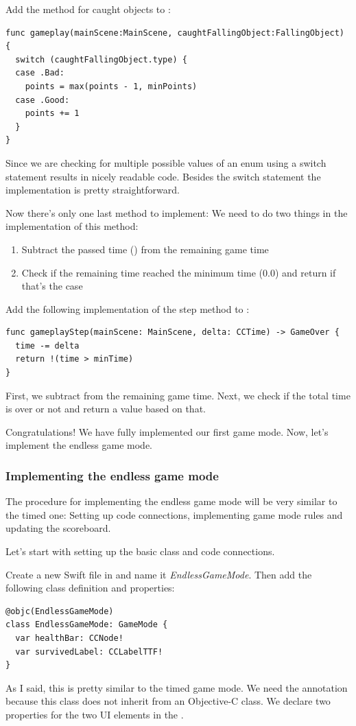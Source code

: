 \begin{leftbar}
Add the method for caught objects to :
\begin{lstlisting}
func gameplay(mainScene:MainScene, caughtFallingObject:FallingObject) {
  switch (caughtFallingObject.type) {
  case .Bad:
    points = max(points - 1, minPoints)
  case .Good:
    points += 1
  }
}
\end{lstlisting}
\end{leftbar}
Since we are checking for multiple possible values of an enum using a switch
statement results in nicely readable code. Besides the switch statement the
implementation is pretty straightforward.

Now there's only one last method to implement:
 We need to do two things in the
implementation of this method:
\begin{enumerate}
  \item Subtract the passed time () from the remaining game
  time
  \item Check if the remaining time reached the minimum time (0.0) and return
   if that's the case
\end{enumerate}
\begin{leftbar}
Add the following implementation of the step method to
:
\begin{lstlisting}
func gameplayStep(mainScene: MainScene, delta: CCTime) -> GameOver {
  time -= delta
  return !(time > minTime)
}
\end{lstlisting}
\end{leftbar}
First, we subtract  from the remaining game time. Next, we
check if the total time is over or not and return a  value
based on that.

Congratulations! We have fully implemented our first game mode. Now, let's
implement the endless game mode.

\subsubsection{Implementing the endless game mode}
The procedure for implementing the endless game mode will be very similar to the
timed one: Setting up code connections, implementing game mode rules and
updating the scoreboard.

Let's start with setting up the basic class and code connections.
\begin{leftbar}
Create a new Swift file in \xcode{} and name it \textit{EndlessGameMode}. Then
add the following class definition and properties:
\begin{lstlisting}
@objc(EndlessGameMode)
class EndlessGameMode: GameMode {
  var healthBar: CCNode!
  var survivedLabel: CCLabelTTF!
}
\end{lstlisting}
\end{leftbar}
As I said, this is pretty similar to the timed game mode. We need the
 annotation because this class does not inherit from an
Objective-C class. We declare two properties for the two UI elements in the
 \ccbfile{}.

